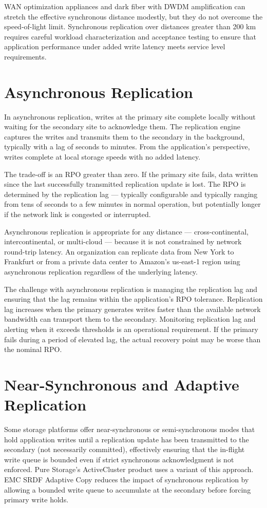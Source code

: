 WAN optimization appliances and dark fiber with DWDM amplification can stretch the effective synchronous distance modestly, but they do not overcome the speed-of-light limit. Synchronous replication over distances greater than 200 km requires careful workload characterization and acceptance testing to ensure that application performance under added write latency meets service level requirements.

\section{Asynchronous Replication}
In asynchronous replication, writes at the primary site complete locally without waiting for the secondary site to acknowledge them. The replication engine captures the writes and transmits them to the secondary in the background, typically with a lag of seconds to minutes. From the application's perspective, writes complete at local storage speeds with no added latency.

The trade-off is an RPO greater than zero. If the primary site fails, data written since the last successfully transmitted replication update is lost. The RPO is determined by the replication lag --- typically configurable and typically ranging from tens of seconds to a few minutes in normal operation, but potentially longer if the network link is congested or interrupted.

Asynchronous replication is appropriate for any distance --- cross-continental, intercontinental, or multi-cloud --- because it is not constrained by network round-trip latency. An organization can replicate data from New York to Frankfurt or from a private data center to Amazon's us-east-1 region using asynchronous replication regardless of the underlying latency.

The challenge with asynchronous replication is managing the replication lag and ensuring that the lag remains within the application's RPO tolerance. Replication lag increases when the primary generates writes faster than the available network bandwidth can transport them to the secondary. Monitoring replication lag and alerting when it exceeds thresholds is an operational requirement. If the primary fails during a period of elevated lag, the actual recovery point may be worse than the nominal RPO.

\section{Near-Synchronous and Adaptive Replication}
Some storage platforms offer near-synchronous or semi-synchronous modes that hold application writes until a replication update has been transmitted to the secondary (not necessarily committed), effectively ensuring that the in-flight write queue is bounded even if strict synchronous acknowledgment is not enforced. Pure Storage's ActiveCluster product uses a variant of this approach. EMC SRDF Adaptive Copy reduces the impact of synchronous replication by allowing a bounded write queue to accumulate at the secondary before forcing primary write holds.


